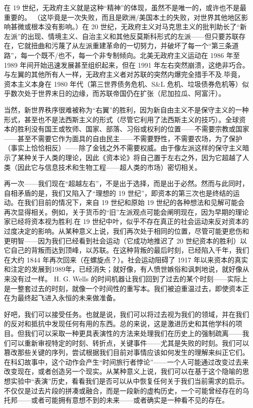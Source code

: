 \documentclass[DIV=12,%
               BCOR=0mm,%
               headinclude=false,%
               footinclude=false,open=any,%
               fontsize=10pt,%
               oneside,%
               paper=210mm:11in]%
               {scrbook}
\newcommand*{\Slash}{\slash\hspace{0pt}}
\begin{document}
在 19 世纪，无政府主义就是这种“精神”的体现，虽然不是唯一的，或许也不是最重要的。 （这毕竟是一次失败，而且是欧洲\Slash{}美国本土的失败，对世界其他地区影响甚微或根本没有影响。）在 20 世纪，无政府主义对马克思主义的批判助长了“新左派”的出现、情境主义、自治主义和其他反莫斯科形式的左派——但只要苏联存在，它就扭曲和污蔑了从左派重建革命的一切努力，并破坏了每一个“第三条道路”，每一个既不\Slash{}也不，每一个非专制倾向。北美无政府主义运动在 1986 年至 1989 年间开始迅速发展甚至组织起来，但在 1991 年左右突然崩溃，这绝非巧合。与左翼的其他所有人一样，无政府主义者对苏联的突然内爆完全措手不及.毕竟，资本主义本身在 1980 年代（第三世界债务危机、S\&L 危机、垃圾债券危机等）似乎数次处于世界末日的边缘，而苏联帝国仍在扩张（尼加拉瓜、阿富汗）。


当然，新世界秩序很难被称为“右翼”的胜利，因为新自由主义不是保守主义的一种形式，甚至也不是法西斯主义的形式（尽管它利用了法西斯主义的技巧）。全球资本的胜利没有国王或牧师、国家、部落、习俗或权利的位置——不需要宗教或国家——甚至不需要它作为面具的自由民主——不需要野性，不需要农场，为了保护（事实上恰恰相反）——除了金钱之外不需要权威。由于像左派这样的保守主义暗示了某种关于人类的理论，因此《资本论》将自己置于左右之外，因为它超越了人类（因此它与信息技术和生物工程——超人类的市场）密切相关。


再一次——我们现在“超越左右”，不是出于选择，而是出于必然。然而与此同时，自相矛盾的是，我们又陷入了“理想的 19 世纪”，即资本的第三次也是终结的运动。在我们目前的情况下，来自 19 世纪和原始 19 世纪的各种想法和见解可能会再次显得相关。例如，关于货币的“旧”左派观点可能会阐明现在，因为早期的理论家已经将资本视为胜利.在 19 世纪中叶，似乎不存在真正的社会运动来反对资本的过度决定的影响。从某种意义上说，我们再次处于相同的位置，尽管可能更悲伤和更明智——因为我们已经看到社会运动（它成功地推迟了 20 世纪资本的胜利）以它自己的背叛而达到顶峰，以苏联。在这种背叛的最后时刻，已经陷入千年，我们在大约 1844 年再次回来（在螺旋点？）。社会运动阻碍了 1917 年以来资本的真实和注定的发展到1989年，已经消失；就好像，有人愤世嫉俗和讽刺地说，就好像从来没有过一样。 H. G. Wells 的时间机器让我们回到了过去的某个时刻——实际上是一整套过去的时刻，就像一个时间性的重写本。我们被迫重温过去，即使资本正在为最终起飞进入永恒的未来做准备。


好吧，我们可以接受任务。也就是说，我们可以将过去视为我们的领域，并在我们的反对和抵抗中发现任何有用的东西。总的来说，这是激进历史和其他学科的项目。但我们可以采取一种更具表演性的方法来处理我们在历史上的强制疏离——我们可以重新审视特定的时刻、转折点，关键事件——尤其是失败的时刻。我们可以篡改那些关键的序列，尝试根据我们目前对事情应该如何发生的理解来纠正它们。在科幻故事中，这个动作会产生“时间旅行者悖论”——一个人可能通过改变过去来改变现在，或者创造另一个现实。从某种意义上说，我们可以在基于这个隐喻的思想实验中“表演”历史，看看我们是否可以从中恢复任何关于我们当前需求的启示。不仅仅是过去片段的拼凑或融合，而是一段新的虚构历史，一个可能曾经存在的乌托邦——或者可能拥有意想不到的未来——或者确实是一种看不见的存在。
\end{document}
